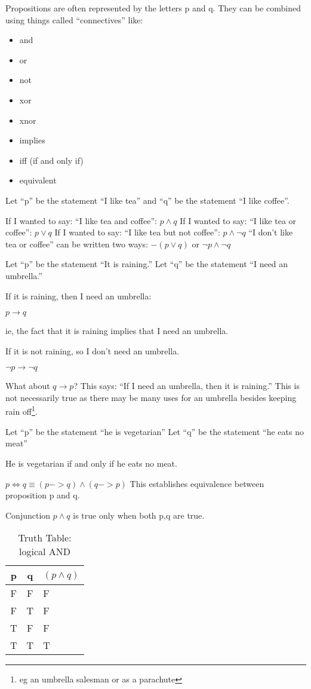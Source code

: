 Propositions are often represented by the letters p and q. They can be combined
using things called ``connectives'' like:
\begin{itemize}
  \item and
  \item or
  \item not
  \item xor
  \item xnor
  \item implies
  \item iff (if and only if)
  \item equivalent
\end{itemize}

Let ``p'' be the statement ``I like tea'' and ``q'' be the statement ``I like
coffee''.

If I wanted to say: ``I like tea and coffee'': $p \land q$
If I wanted to say: ``I like tea or coffee'': $p \lor q$
If I wanted to say: ``I like tea but not coffee'': $p \land \lnot q$
``I don't like tea or coffee'' can be written two ways: $ -(p \lor q)$ or $\lnot p
\land \lnot q $

Let ``p'' be the statement ``It is raining.''
Let ``q'' be the statement ``I need an umbrella.''

If it is raining, then I need an umbrella:

$ p \to q $

ie, the fact that it is raining implies that I need an umbrella.

If it is not raining, so I don't need an umbrella.

$ \lnot p \to \lnot q $

What about $q \to p$?
This says: ``If I need an umbrella, then it is raining.'' This is not
necessarily true as there may be many uses for an umbrella besides keeping rain
off\footnote{eg an umbrella salesman or as a parachute}.

Let ``p'' be the statement ``he is vegetarian''
Let ``q'' be the statement ``he eats no meat''

He is vegetarian if and only if he eats no meat.

$ p \iff q \equiv (p -> q) \land (q -> p)$
This establishes equivalence between proposition p and q.


Conjunction $p \land q$ is true only when both p,q are true.
\begin{table}[!htb]
\label{tab:TruthTableAND}
\begin{tabularx}{\linewidth}{| c | c | X |} \hline
  p & q & $(p \land q)$ \\ \hline \hline
  F & F & F \\ \hline
  F & T & F \\ \hline
  T & F & F \\ \hline
  T & T & T \\ \hline
\end{tabularx}
\caption{Truth Table: logical AND}
\end{table}

